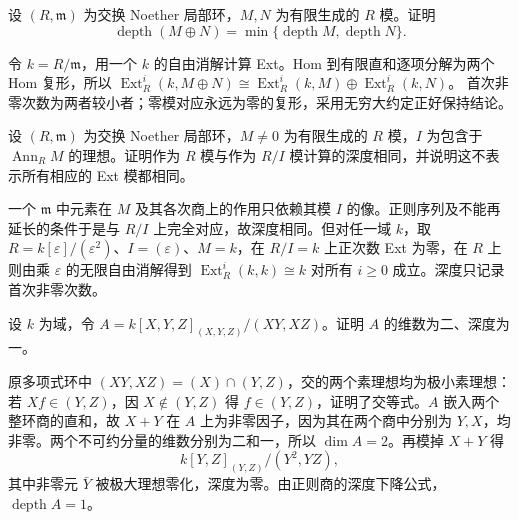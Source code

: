 \begin{exercise}\label{b3:ex:16-direct-sum-depth}
	设 \((R,\mathfrak m)\) 为交换 Noether 局部环，\(M,N\) 为有限生成的 \(R\) 模。证明
	\[
		\operatorname{depth}(M\oplus N)= \min\{\operatorname{depth}M,\operatorname{depth}N\}.
	\]
\end{exercise}
\begin{solution}
	令 \(k=R/\mathfrak m\)，用一个 \(k\) 的自由消解计算 Ext。Hom 到有限直和逐项分解为两个 Hom 复形，所以 \(\operatorname{Ext}_R^i(k,M\oplus N)\cong\operatorname{Ext}_R^i(k,M)\oplus\operatorname{Ext}_R^i(k,N)\)。 首次非零次数为两者较小者；零模对应永远为零的复形，采用无穷大约定正好保持结论。
\end{solution}

\begin{exercise}\label{b3:ex:16-annihilator-base-ring}
	设 \((R,\mathfrak m)\) 为交换 Noether 局部环，\(M\ne0\) 为有限生成的 \(R\) 模，\(I\) 为包含于 \(\operatorname{Ann}_RM\) 的理想。证明作为 \(R\) 模与作为 \(R/I\) 模计算的深度相同，并说明这不表示所有相应的 Ext 模都相同。
\end{exercise}
\begin{solution}
	一个 \(\mathfrak m\) 中元素在 \(M\) 及其各次商上的作用只依赖其模 \(I\) 的像。正则序列及不能再延长的条件于是与 \(R/I\) 上完全对应，故深度相同。但对任一域 \(k\)，取 \(R=k[\varepsilon]/(\varepsilon^2)\)、\(I=(\varepsilon)\)、\(M=k\)，在 \(R/I=k\) 上正次数 Ext 为零，在 \(R\) 上则由乘 \(\varepsilon\) 的无限自由消解得到 \(\operatorname{Ext}_R^i(k,k)\cong k\) 对所有 \(i\ge0\) 成立。深度只记录首次非零次数。
\end{solution}

\begin{exercise}\label{b3:ex:16-mixed-components}
	设 \(k\) 为域，令 \(A=k[X,Y,Z]_{(X,Y,Z)}/(XY,XZ)\)。证明 \(A\) 的维数为二、深度为一。
\end{exercise}
\begin{solution}
	原多项式环中 \((XY,XZ)=(X)\cap(Y,Z)\)，交的两个素理想均为极小素理想：若 \(Xf\in(Y,Z)\)，因 \(X\notin(Y,Z)\) 得 \(f\in(Y,Z)\)，证明了交等式。\(A\) 嵌入两个整环商的直和，故 \(X+Y\) 在 \(A\) 上为非零因子，因为其在两个商中分别为 \(Y,X\)，均非零。两个不可约分量的维数分别为二和一，所以 \(\dim A=2\)。再模掉 \(X+Y\) 得
	\[
		k[Y,Z]_{(Y,Z)}/(Y^2,YZ),
	\]
	其中非零元 \(\bar Y\) 被极大理想零化，深度为零。由正则商的深度下降公式，\(\operatorname{depth}A=1\)。
\end{solution}

